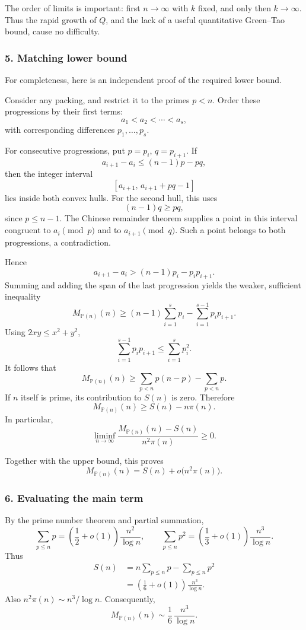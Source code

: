 \documentclass[
  11pt,
  a4paper,
]{article}
\begin{document}
The order of limits is important: first \(n\to\infty\) with \(k\) fixed,
and only then \(k\to\infty\). Thus the rapid growth of \(Q\), and the
lack of a useful quantitative Green--Tao bound, cause no difficulty.

\subsubsection{5. Matching lower bound}\label{matching-lower-bound}

For completeness, here is an independent proof of the required lower
bound.

Consider any packing, and restrict it to the primes \(p<n\). Order these
progressions by their first terms: \[
a_1<a_2<\cdots<a_s,
\] with corresponding differences \(p_1,\ldots,p_s\).

For consecutive progressions, put \(p=p_i\), \(q=p_{i+1}\). If \[
a_{i+1}-a_i\le (n-1)p-pq,
\] then the integer interval \[
[a_{i+1},\,a_{i+1}+pq-1]
\] lies inside both convex hulls. For the second hull, this uses \[
(n-1)q\ge pq,
\] since \(p\le n-1\). The Chinese remainder theorem supplies a point in
this interval congruent to \(a_i\pmod p\) and to \(a_{i+1}\pmod q\).
Such a point belongs to both progressions, a contradiction.

Hence \[
a_{i+1}-a_i>(n-1)p_i-p_ip_{i+1}.
\] Summing and adding the span of the last progression yields the
weaker, sufficient inequality \[
M_{\mathbb P(n)}(n)
\ge
(n-1)\sum_{i=1}^s p_i
-\sum_{i=1}^{s-1}p_ip_{i+1}.
\] Using \(2xy\le x^2+y^2\), \[
\sum_{i=1}^{s-1}p_ip_{i+1}
\le \sum_{i=1}^s p_i^2.
\] It follows that \[
M_{\mathbb P(n)}(n)
\ge
\sum_{p<n}p(n-p)-\sum_{p<n}p.
\] If \(n\) itself is prime, its contribution to \(S(n)\) is zero.
Therefore \[
M_{\mathbb P(n)}(n)\ge S(n)-n\pi(n).
\] In particular, \[
\liminf_{n\to\infty}
\frac{M_{\mathbb P(n)}(n)-S(n)}{n^2\pi(n)}
\ge0.
\]

Together with the upper bound, this proves \[
M_{\mathbb P(n)}(n)
=
S(n)+o\bigl(n^2\pi(n)\bigr).
\]

\subsubsection{6. Evaluating the main
term}\label{evaluating-the-main-term}

By the prime number theorem and partial summation, \[
\sum_{p\le n}p
=
\left(\frac12+o(1)\right)\frac{n^2}{\log n},
\qquad
\sum_{p\le n}p^2
=
\left(\frac13+o(1)\right)\frac{n^3}{\log n}.
\] Thus \begin{equation*}
\begin{aligned}
S(n)
&=n\sum_{p\le n}p-\sum_{p\le n}p^2\\
&=
\left(\frac16+o(1)\right)\frac{n^3}{\log n}.
\end{aligned}
\end{equation*} Also \(n^2\pi(n)\sim n^3/\log n\). Consequently, \[
\boxed{\displaystyle
M_{\mathbb P(n)}(n)\sim \frac16\,\frac{n^3}{\log n}.
}
\]
\end{document}
